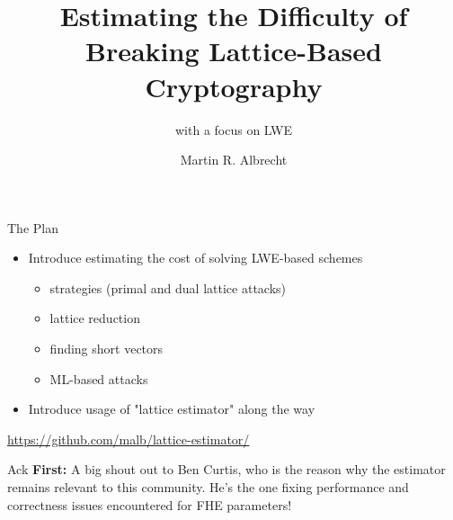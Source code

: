 \documentclass[table,10pt,aspectratio=169]{beamer}
\institute{King's College London \& SandboxAQ}
\author{Martin R. Albrecht}
\date{}
\title{Estimating the Difficulty of Breaking Lattice-Based Cryptography}
\subtitle{with a focus on LWE}
\begin{document}
\maketitle

\begin{frame}[label={sec:orgbf7bd07}]{The Plan}
\begin{itemize}
\item Introduce estimating the cost of solving LWE-based schemes
\begin{itemize}
\item strategies (primal and dual lattice attacks)
\item lattice reduction
\item finding short vectors
\item ML-based attacks
\end{itemize}
\item Introduce usage of "lattice estimator" along the way
\end{itemize}

\begin{alertblock}{}
\begin{center}
\url{https://github.com/malb/lattice-estimator/}
\end{center}
\end{alertblock}
\end{frame}

\begin{frame}[label={sec:orgd1f0794}]{Ack}
\textbf{First:} A big shout out to Ben Curtis, who is the reason why the estimator remains relevant to this community. He's the one fixing performance and correctness issues encountered for FHE parameters!
\end{frame}
\end{document}
